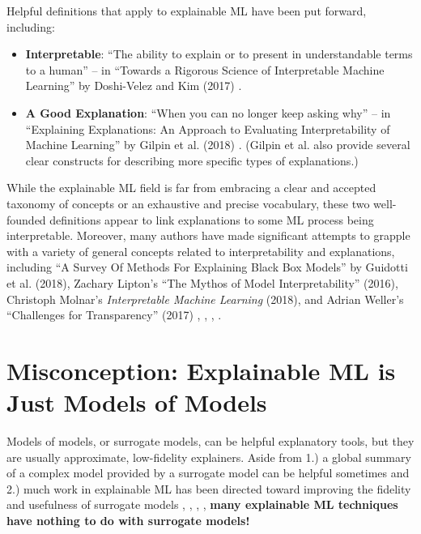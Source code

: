 \documentclass[fleqn]{article}
\begin{document}
Helpful definitions that apply to explainable ML have been put forward, including:

\begin{itemize}
\item \textbf{Interpretable}: ``The ability to explain or to present in understandable terms to a human'' -- in ``Towards a Rigorous Science of Interpretable Machine Learning'' by Doshi-Velez and Kim (2017) \cite{been_kim1}.
\item \textbf{A Good Explanation}: ``When you can no longer keep asking why'' -- in ``Explaining Explanations: An Approach to Evaluating Interpretability of Machine Learning'' by Gilpin et al. (2018) \cite{gilpin2018explaining}. (Gilpin et al. also provide several clear constructs for describing more specific types of explanations.) 
\end{itemize}



While the explainable ML field is far from embracing a clear and accepted taxonomy of concepts or an exhaustive and precise vocabulary, these two well-founded definitions appear to link explanations to some ML process being interpretable. Moreover, many authors have made significant attempts to grapple with a variety of general concepts related to interpretability and explanations, including ``A Survey Of Methods For Explaining Black Box Models'' by Guidotti et al. (2018), Zachary Lipton's ``The Mythos of Model Interpretability'' (2016), Christoph Molnar's \textit{Interpretable Machine Learning} (2018), and Adrian Weller's ``Challenges for Transparency'' (2017) \cite{guidotti2018survey},  \cite{lipton1}, \cite{molnar}, \cite{weller2017challenges}. 

\section{Misconception: Explainable ML is Just Models of Models}

Models of models, or surrogate models, can be helpful explanatory tools, but they are usually approximate, low-fidelity explainers. Aside from 1.) a global summary of a complex model provided by a surrogate model can be helpful sometimes and 2.) much work in explainable ML has been directed toward improving the fidelity and usefulness of surrogate models \cite{dt_surrogate1}, \cite{dt_surrogate2}, \cite{lime-sup}, \cite{wf_xnn}, \textbf{many explainable ML techniques have nothing to do with surrogate models!}   
\end{document}
